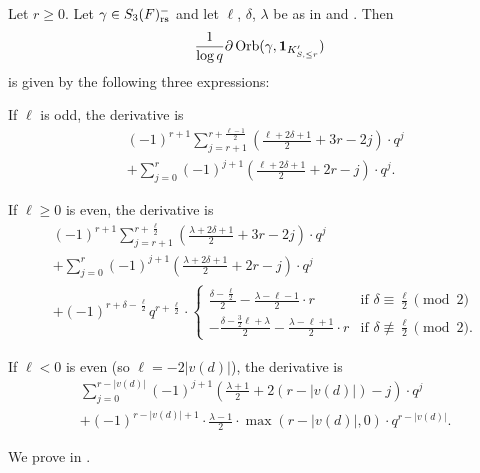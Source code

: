 \begin{theorem}
  \label{thm:S3_orbital_deriv}
  Let $r \ge 0$.
  Let $\gamma \in S_3(F)_{\mathrm{rs}}^-$ and let $\ell$, $\delta$, $\lambda$
  be as in  and .
  Then
  \[ \frac{1}{\log q} \partial\operatorname{Orb}(\gamma, \mathbf{1}_{K'_{S, \le r}}) \]
  is given by the following three expressions:
  \begin{itemize}
    \ii If $\ell$ is odd, the derivative is
    \begin{align*}
      &(-1)^{r+1} \sum_{j=r+1}^{r+\frac{\ell-1}{2}} \left( \frac{\ell+2\delta+1}{2} + 3r - 2j \right) \cdot q^j \\
      &+ \sum_{j=0}^{r} (-1)^{j+1} \left( \frac{\ell+2\delta+1}{2} + 2r - j \right) \cdot q^j.
    \end{align*}

    \ii If $\ell \ge 0$ is even, the derivative is
    \begin{align*}
      &(-1)^{r+1} \sum_{j=r+1}^{r+\frac{\ell}{2}} \left( \frac{\lambda+2\delta+1}{2} + 3r - 2j \right) \cdot q^j \\
      &+ \sum_{j=0}^{r} (-1)^{j+1} \left( \frac{\lambda+2\delta+1}{2} + 2r - j \right) \cdot q^j \\
      &+ (-1)^{r+\delta-\frac{\ell}{2}} q^{r+\frac{\ell}{2}} \cdot \begin{cases}
        \frac{\delta - \frac{\ell}{2}}{2} - \frac{\lambda - \ell-1}{2} \cdot r & \text{if } \delta \equiv \frac{\ell}{2} \pmod 2 \\
        - \frac{\delta - \frac32\ell + \lambda}{2} - \frac{\lambda - \ell+1}{2} \cdot r & \text{if } \delta \not\equiv \frac{\ell}{2} \pmod 2.
    \end{cases}
    \end{align*}

    \ii If $\ell < 0$ is even (so $\ell = -2|v(d)|$), the derivative is
    \begin{align*}
      &\sum_{j=0}^{r-|v(d)|} (-1)^{j+1} \left( \frac{\lambda+1}{2} + 2(r-|v(d)|) - j \right) \cdot q^j \\
      &+ (-1)^{r-|v(d)|+1} \cdot \frac{\lambda-1}{2} \cdot \max\left( r-|v(d)|, 0 \right) \cdot q^{r-|v(d)|}.
    \end{align*}
  \end{itemize}
\end{theorem}
We prove  in .
